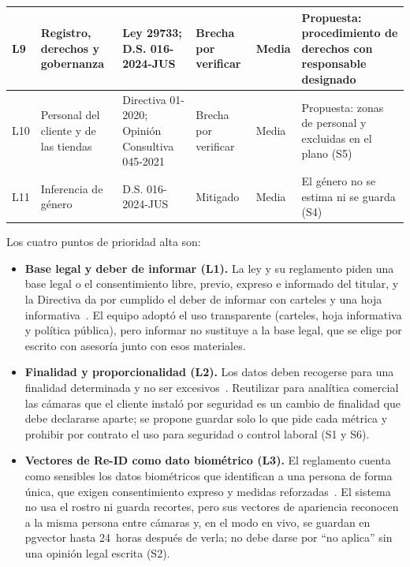 \documentclass[12pt,a4paper]{article}
\begin{document}
\begin{table}[!htbp]
\begin{tabular}{|L{0.04\textwidth}|L{0.16\textwidth}|L{0.15\textwidth}|L{0.13\textwidth}|L{0.11\textwidth}|L{0.24\textwidth}|}
\hline
L9 & Registro, derechos y gobernanza & Ley 29733; D.S. 016-2024-JUS & Brecha por verificar & Media & Propuesta: procedimiento de derechos con responsable designado \\
\hline
L10 & Personal del cliente y de las tiendas & Directiva 01-2020; Opinión Consultiva 045-2021 & Brecha por verificar & Media & Propuesta: zonas de personal y excluidas en el plano (S5) \\
\hline
L11 & Inferencia de género & D.S. 016-2024-JUS & Mitigado & Media & El género no se estima ni se guarda (S4) \\
\hline
\end{tabular}
\end{table}

Los cuatro puntos de prioridad alta son:

\begin{itemize}
    \item \textbf{Base legal y deber de informar (L1).} La ley y su reglamento
    piden una base legal o el consentimiento libre, previo, expreso e informado
    del titular, y la Directiva da por cumplido el deber de informar con carteles
    y una hoja informativa~\cite{ley29733,reglamento29733,directiva-videovigilancia}.
    El equipo adoptó el uso transparente (carteles, hoja informativa y política
    pública), pero informar no sustituye a la base legal, que se elige por
    escrito con asesoría junto con esos materiales.

    \item \textbf{Finalidad y proporcionalidad (L2).} Los datos deben recogerse
    para una finalidad determinada y no ser excesivos~\cite{ley29733,directiva-videovigilancia}.
    Reutilizar para analítica comercial las cámaras que el cliente instaló por
    seguridad es un cambio de finalidad que debe declararse aparte; se propone
    guardar solo lo que pide cada métrica y prohibir por contrato el uso para
    seguridad o control laboral (S1 y S6).

    \item \textbf{Vectores de Re-ID como dato biométrico (L3).} El reglamento
    cuenta como sensibles los datos biométricos que identifican a una persona de
    forma única, que exigen consentimiento expreso y medidas
    reforzadas~\cite{reglamento29733,modelo-biometricos}. El sistema no usa el
    rostro ni guarda recortes, pero sus vectores de apariencia reconocen a la
    misma persona entre cámaras y, en el modo en vivo, se guardan en pgvector
    hasta 24~horas después de verla; no debe darse por ``no aplica'' sin una
    opinión legal escrita (S2).


\end{itemize}
\end{document}

